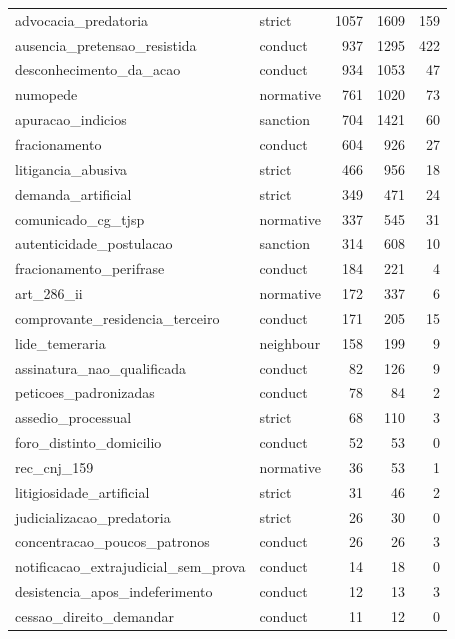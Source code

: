 \begin{table}[htbp]
\begin{tabular}{llrrr}
advocacia\_predatoria & strict & 1057 & 1609 & 159 \\
ausencia\_pretensao\_resistida & conduct & 937 & 1295 & 422 \\
desconhecimento\_da\_acao & conduct & 934 & 1053 & 47 \\
numopede & normative & 761 & 1020 & 73 \\
apuracao\_indicios & sanction & 704 & 1421 & 60 \\
fracionamento & conduct & 604 & 926 & 27 \\
litigancia\_abusiva & strict & 466 & 956 & 18 \\
demanda\_artificial & strict & 349 & 471 & 24 \\
comunicado\_cg\_tjsp & normative & 337 & 545 & 31 \\
autenticidade\_postulacao & sanction & 314 & 608 & 10 \\
fracionamento\_perifrase & conduct & 184 & 221 & 4 \\
art\_286\_ii & normative & 172 & 337 & 6 \\
comprovante\_residencia\_terceiro & conduct & 171 & 205 & 15 \\
lide\_temeraria & neighbour & 158 & 199 & 9 \\
assinatura\_nao\_qualificada & conduct & 82 & 126 & 9 \\
peticoes\_padronizadas & conduct & 78 & 84 & 2 \\
assedio\_processual & strict & 68 & 110 & 3 \\
foro\_distinto\_domicilio & conduct & 52 & 53 & 0 \\
rec\_cnj\_159 & normative & 36 & 53 & 1 \\
litigiosidade\_artificial & strict & 31 & 46 & 2 \\
judicializacao\_predatoria & strict & 26 & 30 & 0 \\
concentracao\_poucos\_patronos & conduct & 26 & 26 & 3 \\
notificacao\_extrajudicial\_sem\_prova & conduct & 14 & 18 & 0 \\
desistencia\_apos\_indeferimento & conduct & 12 & 13 & 3 \\
cessao\_direito\_demandar & conduct & 11 & 12 & 0 \\
\bottomrule
\end{tabular}
\end{table}
